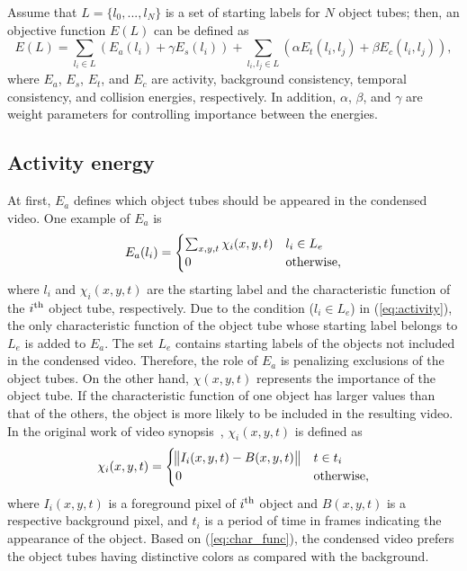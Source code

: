 \documentclass[11pt]{hyu_thesis}
\begin{document}
Assume that $L=\{l_0,...,l_N\}$ is a set of starting labels for $N$ object tubes; then, an objective function $E(L)$ can be defined as
\begin{equation}
\label{eq:basic_form}
E(L)=\sum_{l_i \in L} \left( E_a(l_i) + \gamma E_s(l_i) \right) + \sum_{l_i,l_j \in L} \left( \alpha E_t(l_i, l_j) + \beta E_c(l_i, l_j) \right),
\end{equation}
where $E_a$, $E_s$, $E_t$, and $E_c$ are activity, background consistency, temporal consistency, and collision energies, respectively. In addition, $\alpha$, $\beta$, and $\gamma$ are weight parameters for controlling importance between the energies.

\subsection{Activity energy}
At first, $E_a$ defines which object tubes should be appeared in the condensed video. One example of $E_a$ is
\begin{equation}
\label{eq:activity}
E_a(l_i) =
\begin{cases}
\sum_{x,y,t} \chi_i (x,y,t) & l_i \in L_e \\
0 & \rm{otherwise},
\end{cases}
\end{equation}
where $l_i$ and $\chi_i (x,y,t)$ are the starting label and the characteristic function of the $i^{\rm{th}}$ object tube, respectively. Due to the condition ($l_i \in L_e$) in (\ref{eq:activity}), the only characteristic function of the object tube whose starting label belongs to $L_e$ is added to $E_a$. The set $L_e$ contains starting labels of the objects not included in the condensed video. Therefore, the role of $E_a$ is penalizing exclusions of the object tubes. On the other hand, $\chi (x,y,t)$ represents the importance of the object tube. If the characteristic function of one object has larger values than that of the others, the object is more likely to be included in the resulting video. In the original work of video synopsis~\cite{Rav-Acha2006,Pritch2007,Pritch2008}, $\chi_i (x,y,t)$ is defined as
\begin{equation}
\label{eq:char_func}
\chi_i(x,y,t)=
\begin{cases}
\norm{I_i(x,y,t)-B(x,y,t)} & t \in t_i\\
0 & \rm{otherwise},
\end{cases}
\end{equation}
where $I_i(x,y,t)$ is a foreground pixel of $i^{\rm{th}}$ object and $B(x,y,t)$ is a respective background pixel, and $t_i$ is a period of time in frames indicating the appearance of the object. Based on (\ref{eq:char_func}), the condensed video prefers the object tubes having distinctive colors as compared with the background. 
\end{document}
